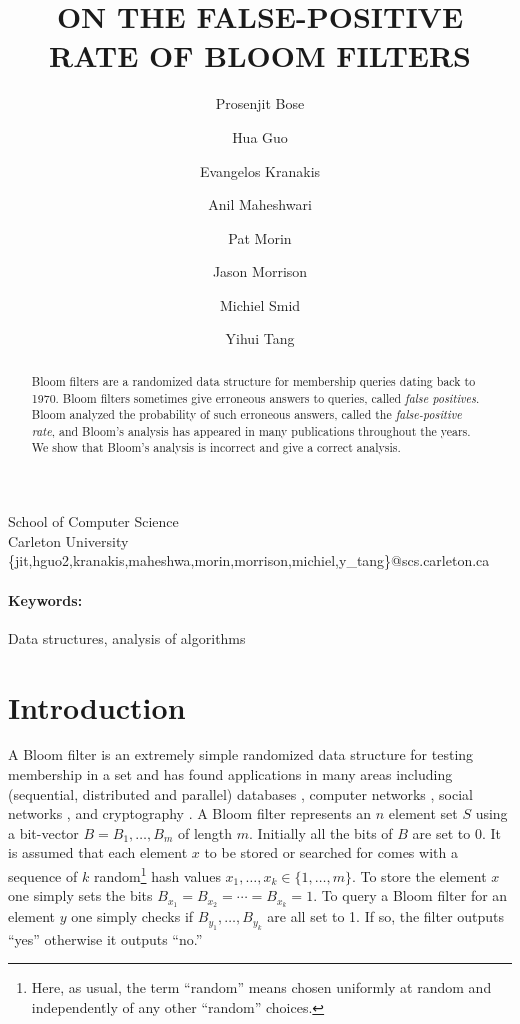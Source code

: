 \documentclass[lotsofwhite]{patmorin}
\title{\MakeUppercase{On the False-Positive Rate of Bloom Filters}}
\author{Prosenjit Bose 
	\and Hua Guo 
	\and Evangelos Kranakis 
	\and Anil Maheshwari 
	\and Pat Morin
	\and Jason Morrison
	\and Michiel Smid 
	\and Yihui Tang}
\date{}
\begin{document}
\maketitle
\vspace{-1.3cm}
\begin{center}
School of Computer Science \\
Carleton University \\
\{jit,hguo2,kranakis,maheshwa,morin,morrison,michiel,y\_tang\}@scs.carleton.ca
\end{center}

\begin{abstract}
Bloom filters are a randomized data structure for membership queries
dating back to 1970.  Bloom filters sometimes give erroneous answers
to queries, called \emph{false positives}.  Bloom analyzed the probability of
such erroneous answers, called the \emph{false-positive rate}, and
Bloom's analysis has appeared in many publications throughout the
years.  We show that Bloom's analysis is incorrect and give a correct
analysis.
\end{abstract}

\paragraph{Keywords:} Data structures, analysis of algorithms

\section{Introduction}

A Bloom filter \cite{b70} is an extremely simple randomized data
structure for testing membership in a set and has found applications
in many areas including (sequential, distributed and parallel)
databases \cite{g82,m83,r82}, computer networks \cite{bm02}, social
networks \cite{loaf}, and cryptography \cite{bc04,g03}. A Bloom filter
represents an $n$ element set $S$ using a bit-vector
$B=B_1,\ldots,B_{m}$ of length $m$.  Initially all the bits of $B$
are set to 0.  It is assumed that each element $x$ to be stored or
searched for comes with a sequence of $k$ random\footnote{Here, as
usual, the term ``random'' means chosen uniformly at random and
independently of any other ``random'' choices.} hash values
$x_1,\ldots,x_k\in \{1,\ldots,m\}$.  To store the element $x$ one
simply sets the bits $B_{x_1}=B_{x_2}=\cdots=B_{x_k}=1$.  To query a
Bloom filter for an element $y$ one simply checks if
$B_{y_1},\ldots,B_{y_k}$ are all set to 1.  If so, the filter outputs
``yes'' otherwise it outputs ``no.''
\end{document}
